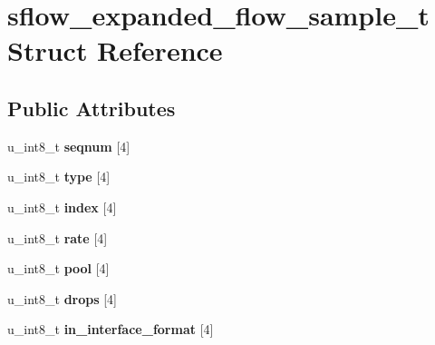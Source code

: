 \hypertarget{structsflow__expanded__flow__sample__t}{
\section{sflow\_\-expanded\_\-flow\_\-sample\_\-t Struct Reference}
\label{structsflow__expanded__flow__sample__t}
}
\subsection*{Public Attributes}
\begin{DoxyCompactItemize}
\item 
\hypertarget{structsflow__expanded__flow__sample__t_ae20bf2b9e800fa66e8f67ea0214549e9}{
u\_\-int8\_\-t {\bfseries seqnum} \mbox{[}4\mbox{]}}
\label{structsflow__expanded__flow__sample__t_ae20bf2b9e800fa66e8f67ea0214549e9}

\item 
\hypertarget{structsflow__expanded__flow__sample__t_aa44204e6dfe8677656092001e209fd9a}{
u\_\-int8\_\-t {\bfseries type} \mbox{[}4\mbox{]}}
\label{structsflow__expanded__flow__sample__t_aa44204e6dfe8677656092001e209fd9a}

\item 
\hypertarget{structsflow__expanded__flow__sample__t_adf986763ecffe6d7b6d0b195957daf71}{
u\_\-int8\_\-t {\bfseries index} \mbox{[}4\mbox{]}}
\label{structsflow__expanded__flow__sample__t_adf986763ecffe6d7b6d0b195957daf71}

\item 
\hypertarget{structsflow__expanded__flow__sample__t_acd99df15e1f57e0069979b141b5a7fb2}{
u\_\-int8\_\-t {\bfseries rate} \mbox{[}4\mbox{]}}
\label{structsflow__expanded__flow__sample__t_acd99df15e1f57e0069979b141b5a7fb2}

\item 
\hypertarget{structsflow__expanded__flow__sample__t_a10ac8cc69715ee5dc612e21021cd57de}{
u\_\-int8\_\-t {\bfseries pool} \mbox{[}4\mbox{]}}
\label{structsflow__expanded__flow__sample__t_a10ac8cc69715ee5dc612e21021cd57de}

\item 
\hypertarget{structsflow__expanded__flow__sample__t_a534eb76a78ebe4c99d8043695a8632d6}{
u\_\-int8\_\-t {\bfseries drops} \mbox{[}4\mbox{]}}
\label{structsflow__expanded__flow__sample__t_a534eb76a78ebe4c99d8043695a8632d6}

\item 
\hypertarget{structsflow__expanded__flow__sample__t_a57d2ba6b94e169bb86617480b3dae799}{
u\_\-int8\_\-t {\bfseries in\_\-interface\_\-format} \mbox{[}4\mbox{]}}
\label{structsflow__expanded__flow__sample__t_a57d2ba6b94e169bb86617480b3dae799}


\end{DoxyCompactItemize}
